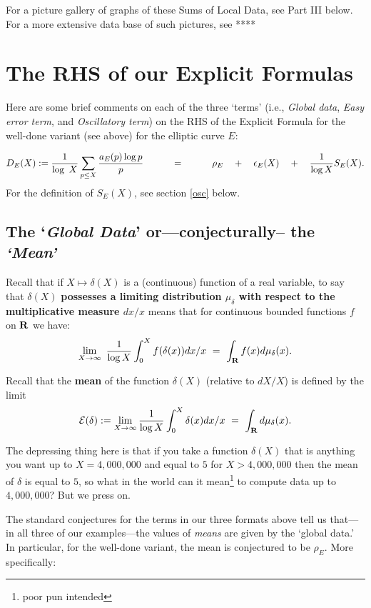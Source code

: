 \documentclass[11pt]{article}
\theoremstyle{plain}
\theoremstyle{definition}
\numberwithin{equation}{section}
\numberwithin{figure}{section}
\numberwithin{table}{section}
\begin{document}
   For a picture gallery of graphs of these Sums of Local Data, see Part III below. For a more extensive data base of such pictures, see ****

  \section{ The RHS of our Explicit Formulas}
   Here are some brief comments on each of the three  `terms' (i.e., {\it Global data}, {\it  Easy error term}, and {\it  Oscillatory term})  on the RHS of the Explicit  Formula for the well-done variant (see above) for the elliptic curve $E$:

   $${D}_E(X):= {\frac{1}{\log\ X}}\sum_{p \le X}{\frac{a_E(p)\log p}{ p}}\hskip30pt = \hskip30pt \rho_E\ \ \  + \  \ \ \epsilon_{E}(X)\ \ \  + \ \ \ {\frac{1}{\log X}}S_E(X).$$ For the definition of $S_E(X)$, see section \ref{osc} below.
 \subsection {The `{\it Global Data}' or---conjecturally-- the {\it `Mean'}}\label{mean}
   Recall that if   $X \mapsto \delta(X)$ is a (continuous) function of a real variable,  to say that $\delta(X)$ {\bf possesses a limiting distribution $\mu_\delta$ with respect to the multiplicative measure $dx/x$} means that  for continuous bounded functions $f$ on ${\bf R}$ we have:
\begin{equation*}
\lim_{X \to {\infty}}\ {\frac{1}{\log X}}\int_0^Xf(\delta(x))dx/x \ = \ \int_{\bf R}f(x)d\mu_\delta(x).
\end{equation*}

\bigskip

    Recall that the {\bf mean} of the function $\delta(X)$ (relative to $dX/X$) is defined by the limit  $${\mathcal E}(\delta):= \lim_{X \to {\infty}}{\frac{1}{\log X}}\int_0^X\delta(x)dx/x \ = \ \int_{\bf R}d\mu_\delta(x).$$

     The depressing thing here is that if you take a function $\delta(X)$ that is anything you want up to $X = 4,000,000$ and equal to $5$ for $X>  4,000,000$ then the mean of $\delta$ is equal to $5$, so what in  the world can it mean{\footnote{ poor pun intended}} to compute data up to $4,000,000$? But we press on.

   The standard conjectures for the terms in our three formats above tell us that---in all three of our examples---the values of {\it means} are given by the `global data.' In particular, for the well-done  variant, the mean is conjectured to be $\rho_E$.  More specifically:
\end{document}
